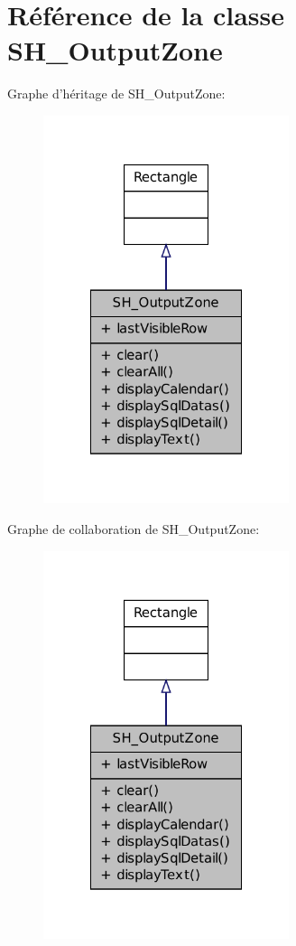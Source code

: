 \hypertarget{classSH__OutputZone}{\section{Référence de la classe S\-H\-\_\-\-Output\-Zone}
\label{classSH__OutputZone}
}


Graphe d'héritage de S\-H\-\_\-\-Output\-Zone\-:\nopagebreak
\begin{figure}[H]
\begin{center}
\leavevmode
\includegraphics[width=204pt]{classSH__OutputZone__inherit__graph}
\end{center}
\end{figure}


Graphe de collaboration de S\-H\-\_\-\-Output\-Zone\-:\nopagebreak
\begin{figure}[H]
\begin{center}
\leavevmode
\includegraphics[width=204pt]{classSH__OutputZone__coll__graph}
\end{center}
\end{figure}
